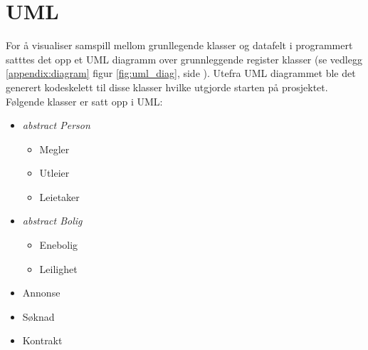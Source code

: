 \section{UML}
For å visualiser samspill mellom grunllegende klasser og datafelt i programmert satttes det opp et UML diagramm over grunnleggende register klasser (se vedlegg \ref{appendix:diagram} figur \ref{fig:uml_diag}, side \pageref{appendix:diagram}). Utefra UML diagrammet ble det generert kodeskelett til disse klasser hvilke utgjorde starten på prosjektet. Følgende klasser er satt opp i UML:
\begin{itemize}[noitemsep,nolistsep]
	\item \textit{abstract Person}
		\begin{itemize}
			\item Megler
			\item Utleier
			\item Leietaker
		\end{itemize}
	\item \textit{abstract Bolig}
		\begin{itemize}
			\item Enebolig
			\item Leilighet
		\end{itemize}
	\item Annonse
	\item Søknad
	\item Kontrakt
\end{itemize}


